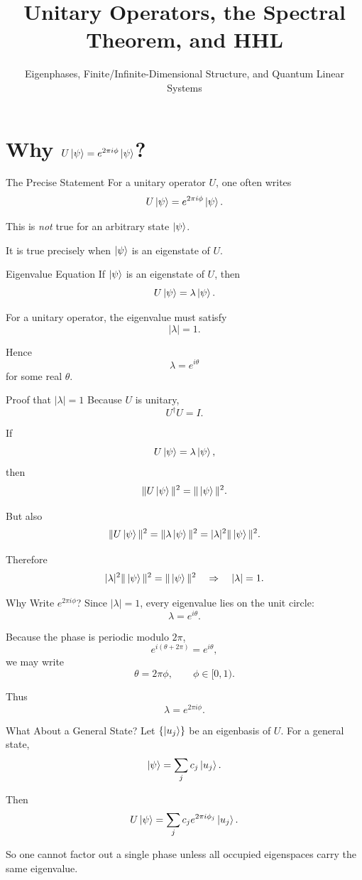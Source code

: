 \documentclass{beamer}
\title{Unitary Operators, the Spectral Theorem, and HHL}
\subtitle{Eigenphases, Finite/Infinite-Dimensional Structure, and Quantum Linear Systems}
\author{}
\date{}
\begin{document}
\frame{\titlepage}

\section{Why \(U\ket{\psi}=e^{2\pi i\phi}\ket{\psi}\)?}

\begin{frame}{The Precise Statement}
For a unitary operator \(U\), one often writes
\[
U\ket{\psi}=e^{2\pi i\phi}\ket{\psi}.
\]

This is \emph{not} true for an arbitrary state \(\ket{\psi}\).

\medskip

It is true precisely when \(\ket{\psi}\) is an eigenstate of \(U\).
\end{frame}

\begin{frame}{Eigenvalue Equation}
If \(\ket{\psi}\) is an eigenstate of \(U\), then
\[
U\ket{\psi}=\lambda \ket{\psi}.
\]

For a unitary operator, the eigenvalue must satisfy
\[
|\lambda|=1.
\]

Hence
\[
\lambda=e^{i\theta}
\]
for some real \(\theta\).
\end{frame}

\begin{frame}{Proof that \(|\lambda|=1\)}
Because \(U\) is unitary,
\[
U^\dagger U = I.
\]

If
\[
U\ket{\psi}=\lambda\ket{\psi},
\]
then
\[
\|U\ket{\psi}\|^2 = \|\ket{\psi}\|^2.
\]

But also
\[
\|U\ket{\psi}\|^2 = \|\lambda \ket{\psi}\|^2 = |\lambda|^2\|\ket{\psi}\|^2.
\]

Therefore
\[
|\lambda|^2\|\ket{\psi}\|^2=\|\ket{\psi}\|^2
\quad\Rightarrow\quad
|\lambda|=1.
\]
\end{frame}

\begin{frame}{Why Write \(e^{2\pi i\phi}\)?}
Since \(|\lambda|=1\), every eigenvalue lies on the unit circle:
\[
\lambda=e^{i\theta}.
\]

Because the phase is periodic modulo \(2\pi\),
\[
e^{i(\theta+2\pi)}=e^{i\theta},
\]
we may write
\[
\theta=2\pi\phi,
\qquad
\phi\in[0,1).
\]

Thus
\[
\lambda=e^{2\pi i\phi}.
\]
\end{frame}

\begin{frame}{What About a General State?}
Let \(\{\ket{u_j}\}\) be an eigenbasis of \(U\). For a general state,
\[
\ket{\psi}=\sum_j c_j \ket{u_j}.
\]

Then
\[
U\ket{\psi}=\sum_j c_j e^{2\pi i\phi_j}\ket{u_j}.
\]

So one cannot factor out a single phase unless all occupied eigenspaces carry the same eigenvalue.
\end{frame}
\end{document}
